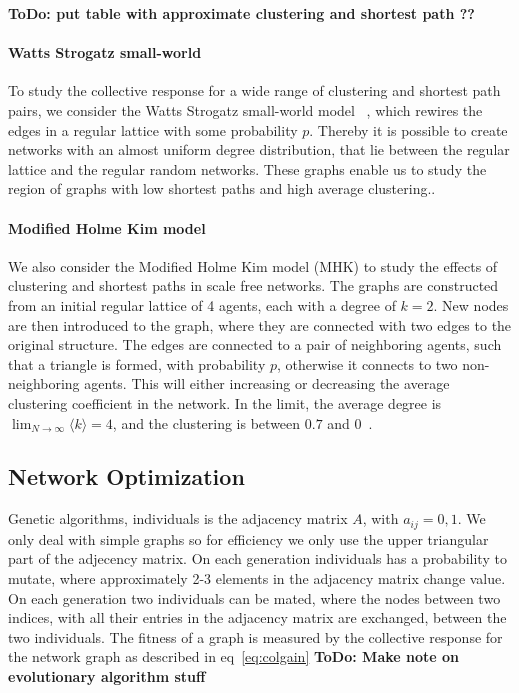\documentclass[fleqn,10pt]{wlscirep}
\newcommand{\TODO}[1]{{\bf {\color{red} ToDo:} #1}}
\begin{document}
\TODO{put table with approximate clustering and shortest path ??}

\paragraph{Watts Strogatz small-world}

To study the collective response for a wide range of clustering and shortest path pairs, we consider the Watts Strogatz small-world model~ \cite{watts1998collective}, which rewires the edges in a regular lattice with some probability $p$. Thereby it is possible to create networks with an almost uniform degree distribution, that lie between the regular lattice and the regular random networks. These graphs enable us to study the region of graphs with low shortest paths and high average clustering..


\paragraph{Modified Holme Kim model}
We also consider the Modified Holme Kim model (MHK) to study the effects of clustering and shortest paths in scale free networks. The graphs are constructed from an initial regular lattice of 4 agents, each with a degree of $k=2$. New nodes are then introduced to the graph, where they are connected with two edges to the original structure. The edges are connected to a pair of neighboring agents, such that a triangle is formed, with probability $p$, otherwise it connects to two non-neighboring agents. This will either increasing or decreasing the average clustering coefficient in the network. In the limit, the average degree is  $\lim_{ N\to \infty} \langle k \rangle = 4$, and the clustering is between $0.7$ and $0$~\cite{sekunda16:_inter}.


\subsection*{Network Optimization}

Genetic algorithms, individuals is the adjacency matrix $A$, with $a_{ij} = {0,1}$. We only deal with simple graphs so for efficiency we only use the upper triangular part of the adjecency matrix. On each generation individuals has a probability to mutate, where approximately 2-3 elements in the adjacency matrix change value. On each generation two individuals can be mated, where the nodes between two indices, with all their entries in the adjacency matrix are exchanged, between the two individuals. The fitness of a graph is measured by the collective response for the network graph as described in eq~\ref{eq:colgain}
\TODO{Make note on evolutionary algorithm stuff}
\end{document}

